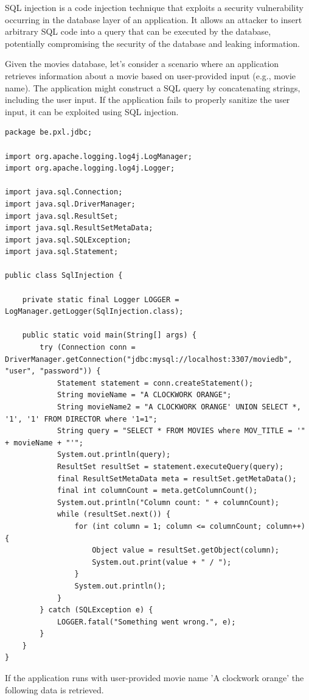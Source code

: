 SQL injection is a code injection technique that exploits a security vulnerability occurring in the database layer of an application. It allows an attacker to insert arbitrary SQL code into a query that can be executed by the database, potentially compromising the security of the database and leaking information.

Given the movies database, let's consider a scenario where an application retrieves information about a movie based on user-provided input (e.g., movie name). The application might construct a SQL query by concatenating strings,  including the user input. If the application fails to properly sanitize the user input, it can be exploited using SQL injection.

\begin{lstlisting}
package be.pxl.jdbc;

import org.apache.logging.log4j.LogManager;
import org.apache.logging.log4j.Logger;

import java.sql.Connection;
import java.sql.DriverManager;
import java.sql.ResultSet;
import java.sql.ResultSetMetaData;
import java.sql.SQLException;
import java.sql.Statement;

public class SqlInjection {

	private static final Logger LOGGER = LogManager.getLogger(SqlInjection.class);

	public static void main(String[] args) {
		try (Connection conn = DriverManager.getConnection("jdbc:mysql://localhost:3307/moviedb", "user", "password")) {
			Statement statement = conn.createStatement();
			String movieName = "A CLOCKWORK ORANGE";
			String movieName2 = "A CLOCKWORK ORANGE' UNION SELECT *, '1', '1' FROM DIRECTOR where '1=1";
			String query = "SELECT * FROM MOVIES where MOV_TITLE = '" + movieName + "'";
			System.out.println(query);
			ResultSet resultSet = statement.executeQuery(query);
			final ResultSetMetaData meta = resultSet.getMetaData();
			final int columnCount = meta.getColumnCount();
			System.out.println("Column count: " + columnCount);
			while (resultSet.next()) {
				for (int column = 1; column <= columnCount; column++) {
					Object value = resultSet.getObject(column);
					System.out.print(value + " / ");
				}
				System.out.println();
			}
		} catch (SQLException e) {
			LOGGER.fatal("Something went wrong.", e);
		}
	}
}

\end{lstlisting}

If the application runs with user-provided movie name 'A clockwork orange' the following data is retrieved.


